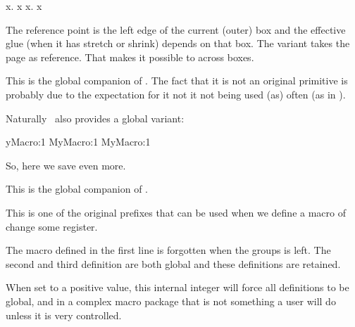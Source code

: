 \starttyping
x\leaders \hbox {\hss.\hss} \hfill            x
x\leaders \hbox {\hss.\hss} \hskip 6cm \relax x
\stoptyping

The reference point is the left edge of the current (outer) box and the effective
glue (when it has stretch or shrink) depends on that box. The 
variant takes the page as reference. That makes it possible to 
across boxes.

\stopnewprimitive

\startnewprimitive[title={\prm {glet}}]

This is the global companion of . The fact that it is not an original
primitive is probably due to the expectation for it not it not being used (as)
often (as in \CONTEXT).

\stopnewprimitive

\startnewprimitive[title={\prm {gletcsname}}]

Naturally \LUAMETATEX\ also provides a global variant:

\starttyping
\expandafter\global\expandafter\let\csname MyMacro:1\endcsname\relax
\expandafter                  \glet\csname MyMacro:1\endcsname\relax
                               \gletcsname MyMacro:1\endcsname\relax
\stoptyping

So, here we save even more.

\stopnewprimitive

\startnewprimitive[title={\prm {glettonothing}}]

This is the global companion of .

\stopnewprimitive

\startoldprimitive[title={\prm {global}}]

This is one of the original prefixes that can be used when we define a macro of
change some register.

\starttyping
\bgroup
       \def\MyMacroA{a}
\global\def\MyMacroB{a}
      \gdef\MyMacroC{a}
\egroup
\stoptyping

The macro defined in the first line is forgotten when the groups is left. The
second and third definition are both global and these definitions are retained.

\stopoldprimitive

\startoldprimitive[title={\prm {globaldefs}}]

When set to a positive value, this internal integer will force all definitions to
be global, and in a complex macro package that is not something a user will do
unless it is very controlled.

